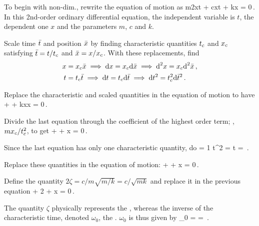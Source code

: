 To begin with non-dim., rewrite the equation of motion as
\beq
m\nxod 2xt + c\xod xt + kx = 0\,.
\eeq
In this 2nd-order ordinary differential equation, the independent variable is $t$, the dependent one $x$ and the parameters $m$, $c$ and $k$.

Scale time $\bar{t}$ and position $\bar{x}$ by finding characteristic quantities ${t}_{c}$ and ${x}_{c}$ satisfying $\bar{t} = t/{t}_{c}$ and $\bar{x} = x/{x}_{c}$. With these replacements, find
\begin{align*}
x &= {x}_{c}\bar{x}\implies \text{d} x = {x}_{c}\text{d} \bar{x} \implies \text{d}^2 x = {x}_{c}\text{d}^2 \bar{x}\,,\\
t &= {t}_{c}\bar{t}\implies \text{d} t = {t}_{c}\text{d} \bar{t} \implies \text{d} t^2 = {t}_{c}^2\text{d} \bar{t}^2\,.
\end{align*}

Replace the characteristic and scaled quantities in the equation of motion to have
\beq
{} +
 +
k\chpq x\scpq x = 0\,.
\eeq

Divide the last equation through the coefficient of the highest order term; \ie, $m{x}_{c}/{t}_{c}^2$, to get
\beq
{} +
 +
\scpq x = 0\,.
\eeq

Since the last equation has only one characteristic quantity, do
\beq
{} = 1\implies 
\chpq t^2 = \implies
\chpq t = \,.
\eeq

Replace these quantities in the equation of motion:
\beq
{} + 
 +
\scpq x = 0\,.
\eeq 

Define the quantity $2\zeta = c/m\sqrt{m/k} = c/\sqrt{mk}$ and replace it in the previous equation
\beq
{} + 
2\zeta{} +
\scpq x = 0\,.
\eeq

The quantity $\zeta$ physically represents the , whereas the inverse of the characteristic time, denoted $\omega_0$, the . $\omega_0$ is thus given by
\beq
\omega_0 =  =  \,.
\eeq

